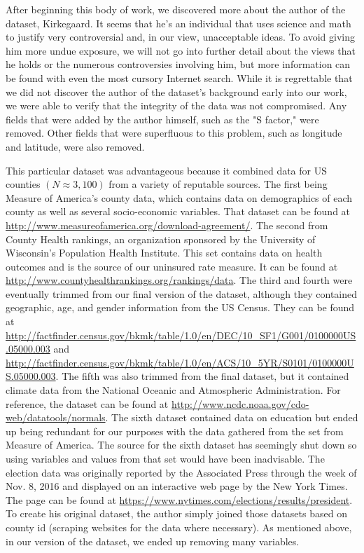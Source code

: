 \documentclass[11pt, conference,compsoc]{IEEEtran}
\begin{document}
After beginning this body of work, we discovered more about the author of the dataset, Kirkegaard. It seems that he's an individual that uses science and math to justify very controversial and, in our view, unacceptable ideas. To avoid giving him more undue exposure, we will not go into further detail about the views that he holds or the numerous controversies involving him, but more information can be found with even the most cursory Internet search. While it is regrettable that we did not discover the author of the dataset's background early into our work, we were able to verify that the integrity of the data was not compromised. Any fields that were added by the author himself, such as the "S factor," were removed. Other fields that were superfluous to this problem, such as longitude and latitude, were also removed.

This particular dataset was advantageous because it combined data for US counties $(N\approx 3,100)$ from a variety of reputable sources. The first being Measure of America's county data, which contains data on demographics of each county as well as several socio-economic variables. That dataset can be found at \url{http://www.measureofamerica.org/download-agreement/}. The second from County Health rankings, an organization sponsored by the University of Wisconsin's Population Health Institute. This set contains data on health outcomes and is the source of our uninsured rate measure. It can be found at \url{http://www.countyhealthrankings.org/rankings/data}. The third and fourth were eventually trimmed from our final version of the dataset, although they contained geographic, age, and gender information from the US Census. They can be found at \url{http://factfinder.census.gov/bkmk/table/1.0/en/DEC/10_SF1/G001/0100000US.05000.003} and \url{http://factfinder.census.gov/bkmk/table/1.0/en/ACS/10_5YR/S0101/0100000US.05000.003}. The fifth was also trimmed from the final dataset, but it contained climate data from the National Oceanic and Atmospheric Administration. For reference, the dataset can be found at \url{http://www.ncdc.noaa.gov/cdo-web/datatools/normals}. The sixth dataset contained data on education but ended up being redundant for our purposes with the data gathered from the set from Measure of America. The source for the sixth dataset has seemingly shut down so using variables and values from that set would have been inadvisable. The election data was originally reported by the Associated Press through the week of Nov. 8, 2016 and displayed on an interactive web page by the New York Times. The page can be found at \url{https://www.nytimes.com/elections/results/president}. To create his original dataset, the author simply joined those datasets based on county id (scraping websites for the data where necessary). As mentioned above, in our version of the dataset, we ended up removing many variables.
\end{document}
